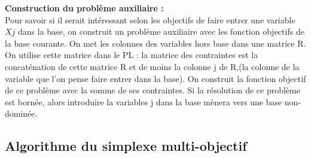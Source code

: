 \documentclass[a4paper,10pt]{article}
\theoremstyle{plain}
\begin{document}
\textbf{Construction du problème auxiliaire :}\\
Pour savoir si il serait intéressant selon les objectifs de faire entrer une variable $Xj$ dans la base, on construit un problème auxiliaire avec les fonction objectifs de la base courante. On met les colonnes des variables hors base dans une matrice R. On utilise cette matrice dans le PL : la matrice des contraintes est la concaténation de cette matrice R et de moins la colonne j de R,(la colonne de la variable que l'on pense faire entrer dans la base). On construit la fonction objectif de ce problème avec la somme de ses contraintes. Si la résolution de ce problème est bornée, alors introduire la variables j dans la base mènera vers une base non-dominée.

\subsection{Algorithme du simplexe multi-objectif}
\end{document}
